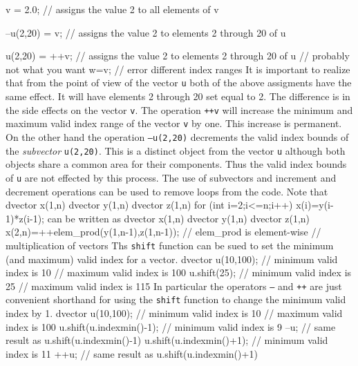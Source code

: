 v = 2.0;   // assigns the value 2 to all elements of v

--u(2,20) = v; // assigns the value 2 to elements 2 through 20 of u

u(2,20) = ++v; // assigns the value 2 to elements 2 through 20 of u
               // probably not what you want
w=v;   // error different index ranges
\endexample
\noindent It is important to realize that from the point of view of the vector
{\tt u} both of the above assigments have the same effect. It will have
elements 2 through 20 set equal to 2. The difference is in the side
effects on the vector {\tt v}. The operation {\tt ++v}
will increase the minimum and maximum valid index range of the vector 
{\tt v} by one. This increase is permanent. On the other hand
the operation {\tt --u(2,20)} decrements the valid index bounds of
the {\it subvector} {\tt u(2,20)}. This is a distinct object from
the vector {\tt u} although both objects share a common area for their
components. Thus the valid index bounds of {\tt u} are not
effected by this process.  
The use of subvectors and increment and decrement
operations can be used to remove loops from the code. Note that
\beginexample
dvector x(1,n)
dvector y(1,n)
dvector z(1,n)
for (int i=2;i<=n;i++)
{
  x(i)=y(i-1)*z(i-1);
}
\endexample
\noindent can be written as
\beginexample
dvector x(1,n)
dvector y(1,n)
dvector z(1,n)
x(2,n)=++elem_prod(y(1,n-1),z(1,n-1));  // elem_prod is element-wise 
                                       // multiplication of vectors
\endexample
{}
Ths {\tt shift} function can be sued to set the minimum (and maximum)
valid index for a vector.
\beginexample
dvector u(10,100);  // minimum valid index is 10
                    // maximum valid index is 100
u.shift(25);        // minimum valid index is 25
                    // maximum valid index is 115
\endexample
\noindent In particular the operators {\tt --} and {\tt ++}
are just convenient shorthand for using the {\tt shift}
function to change the minimum valid index by 1.
\beginexample
dvector u(10,100);     // minimum valid index is 10
                       // maximum valid index is 100
u.shift(u.indexmin()-1); // minimum valid index is 9
--u;                   // same result as u.shift(u.indexmin()-1) 
u.shift(u.indexmin()+1); // minimum valid index is 11
++u;                   // same result as u.shift(u.indexmin()+1) 
\endexample
 
